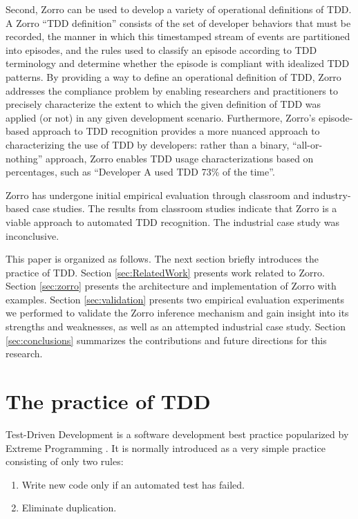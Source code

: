 \documentclass[smallextended]{svjour3}     %
\begin{document}
Second, Zorro can be used to develop a
variety of operational definitions of TDD. A Zorro ``TDD definition''
consists of the set of developer behaviors that must be recorded, the
manner in which this timestamped stream of events are partitioned into
episodes, and the rules used to classify an episode according to TDD terminology and 
determine whether the episode is compliant with idealized TDD patterns.  By
providing a way to define an operational definition of TDD, Zorro addresses
the compliance problem by enabling researchers and practitioners to
precisely characterize the extent to which the given definition of TDD was
applied (or not) in any given development scenario.  Furthermore, Zorro's
episode-based approach to TDD recognition provides a more nuanced approach
to characterizing the use of TDD by developers: rather than a binary,
``all-or-nothing'' approach, Zorro enables TDD usage characterizations
based on percentages, such as ``Developer A used TDD 73\% of the time''.

Zorro has undergone initial empirical evaluation through classroom and
industry-based case studies.  The results from classroom studies indicate that Zorro is a viable
approach to automated TDD recognition. The industrial case study was inconclusive. 

This paper is organized as follows. The next section briefly introduces the practice of TDD.  Section \ref{sec:RelatedWork} presents
work related to Zorro.  Section \ref{sec:zorro} presents the architecture
and implementation of Zorro with examples.  Section \ref{sec:validation}
presents two empirical evaluation experiments we performed to validate the
Zorro inference mechanism and gain insight into its strengths and
weaknesses, as well as an attempted industrial case study. Section \ref{sec:conclusions} summarizes the contributions and
future directions for this research.

\section{The practice of TDD}
\label{sec:PracticeOfTDD}

Test-Driven Development \citep{Beck:03} is a software development 
best practice popularized by Extreme Programming \citep{Jeffries:00,Beck:00}. 
It is normally introduced as a very simple practice consisting of only two rules:

\begin{enumerate}
\item Write new code only if an automated test has failed.
\item Eliminate duplication.
\end{enumerate} 
\end{document}
